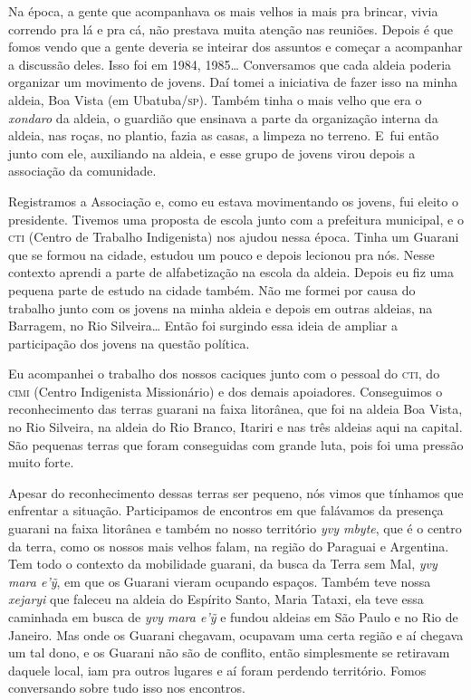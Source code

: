 Na época, a gente que acompanhava os mais velhos ia mais pra brincar,
vivia correndo pra lá e pra cá, não prestava muita atenção nas
reuniões. Depois é que fomos vendo que a gente deveria se inteirar dos
assuntos e começar a acompanhar a discussão deles. Isso foi em 1984,
1985\ldots{} Conversamos que cada aldeia poderia organizar um movimento de
jovens. Daí tomei a iniciativa de fazer isso na minha aldeia, Boa Vista
(em Ubatuba/\textsc{sp}). Também tinha o mais velho que era o \emph{xondaro} da aldeia,
o guardião que ensinava a parte da organização interna da aldeia, nas
roças, no plantio, fazia as casas, a limpeza no terreno. E~fui então
junto com ele, auxiliando na aldeia, e esse grupo de jovens virou
depois a associação da comunidade.

Registramos a Associação e, como eu estava movimentando os jovens, fui
eleito o presidente. Tivemos uma proposta de escola junto com a
prefeitura municipal, e o \textsc{cti} (Centro de Trabalho Indigenista) nos
ajudou nessa época. Tinha um Guarani que se formou na cidade, estudou
um pouco e depois lecionou pra nós. Nesse contexto aprendi a parte de
alfabetização na escola da aldeia. Depois eu fiz uma pequena parte de
estudo na cidade também. Não me formei por causa do trabalho junto com
os jovens na minha aldeia e depois em outras aldeias, na Barragem, no
Rio Silveira\ldots{} Então foi surgindo essa ideia de ampliar a participação
dos jovens na questão política.

Eu acompanhei o trabalho dos nossos caciques junto com o pessoal do \textsc{cti},
do \textsc{cimi} (Centro Indigenista Missionário) e dos demais apoiadores.
Conseguimos o reconhecimento das terras guarani na faixa litorânea, que
foi na aldeia Boa Vista, no Rio Silveira, na aldeia do Rio Branco,
Itariri e nas três aldeias aqui na capital. São pequenas terras que
foram conseguidas com grande luta, pois foi uma pressão muito forte. 

Apesar do reconhecimento dessas terras ser pequeno, nós vimos que
tínhamos que enfrentar a situação. Participamos de encontros em que
falávamos da presença guarani na faixa litorânea e também no nosso
território \emph{yvy mbyte}, que é o centro da terra, como os nossos mais
velhos falam, na região do Paraguai e Argentina. Tem todo o contexto da
mobilidade guarani, da busca da Terra sem Mal, \emph{yvy mara e’ỹ}, em que
os Guarani vieram ocupando espaços. Também teve nossa \emph{xejaryi} que
faleceu na aldeia do Espírito Santo, Maria Tataxi, ela
teve essa caminhada em busca de \emph{yvy mara e’ỹ} e fundou aldeias em
São Paulo e no Rio de Janeiro. Mas onde os Guarani chegavam, ocupavam
uma certa região e aí chegava um tal dono, e os Guarani não são de
conflito, então simplesmente se retiravam daquele local, iam pra outros
lugares e aí foram perdendo território. Fomos conversando sobre tudo
isso nos encontros.

